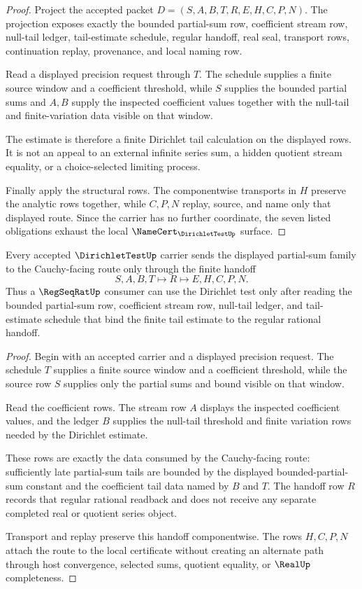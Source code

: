 \begin{proof}
Project the accepted packet $D=(S,A,B,T,R,E,H,C,P,N)$. The projection exposes exactly the bounded partial-sum row, coefficient stream row, null-tail ledger, tail-estimate schedule, regular handoff, real seal, transport rows, continuation replay, provenance, and local naming row.

Read a displayed precision request through $T$. The schedule supplies a finite source window and a coefficient threshold, while $S$ supplies the bounded partial sums and $A,B$ supply the inspected coefficient values together with the null-tail and finite-variation data visible on that window.

The estimate is therefore a finite Dirichlet tail calculation on the displayed rows. It is not an appeal to an external infinite series sum, a hidden quotient stream equality, or a choice-selected limiting process.

Finally apply the structural rows. The componentwise transports in $H$ preserve the analytic rows together, while $C,P,N$ replay, source, and name only that displayed route. Since the carrier has no further coordinate, the seven listed obligations exhaust the local $\NameCert_{\DirichletTestUp}$ surface.
\end{proof}

\begin{theorem}
\label{thm:dirichlet-test-cauchy-handoff}
Every accepted $\DirichletTestUp$ carrier sends the displayed partial-sum family to the Cauchy-facing route only through the finite handoff
$$
S,A,B,T \longmapsto R \longmapsto E,H,C,P,N.
$$
Thus a $\RegSeqRatUp$ consumer can use the Dirichlet test only after reading the bounded partial-sum row, coefficient stream row, null-tail ledger, and tail-estimate schedule that bind the finite tail estimate to the regular rational handoff.
\end{theorem}
\begin{proof}
Begin with an accepted carrier and a displayed precision request. The schedule $T$ supplies a finite source window and a coefficient threshold, while the source row $S$ supplies only the partial sums and bound visible on that window.

Read the coefficient rows. The stream row $A$ displays the inspected coefficient values, and the ledger $B$ supplies the null-tail threshold and finite variation rows needed by the Dirichlet estimate.

These rows are exactly the data consumed by the Cauchy-facing route: sufficiently late partial-sum tails are bounded by the displayed bounded-partial-sum constant and the coefficient tail data named by $B$ and $T$. The handoff row $R$ records that regular rational readback and does not receive any separate completed real or quotient series object.

Transport and replay preserve this handoff componentwise. The rows $H,C,P,N$ attach the route to the local certificate without creating an alternate path through host convergence, selected sums, quotient equality, or $\RealUp$ completeness.
\end{proof}

